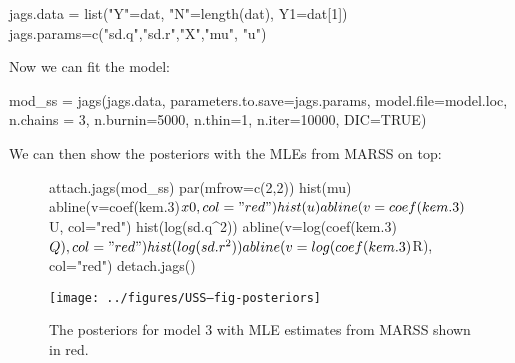 \begin{Schunk}
\begin{Sinput}
 jags.data = list("Y"=dat, "N"=length(dat), Y1=dat[1])
 jags.params=c("sd.q","sd.r","X","mu", "u")
\end{Sinput}
\end{Schunk}
Now we can fit the model:
\begin{Schunk}
\begin{Sinput}
 mod_ss = jags(jags.data, parameters.to.save=jags.params, 
      model.file=model.loc, n.chains = 3, 
      n.burnin=5000, n.thin=1, n.iter=10000, DIC=TRUE)
\end{Sinput}
\end{Schunk}

We can then show the posteriors with the MLEs from MARSS on top:
\begin{figure}[htp]
\begin{center}
\begin{Schunk}
\begin{Sinput}
 attach.jags(mod_ss)
 par(mfrow=c(2,2))
 hist(mu)
 abline(v=coef(kem.3)$x0, col="red")
 hist(u)
 abline(v=coef(kem.3)$U, col="red")
 hist(log(sd.q^2))
 abline(v=log(coef(kem.3)$Q), col="red")
 hist(log(sd.r^2))
 abline(v=log(coef(kem.3)$R), col="red")
 detach.jags()
\end{Sinput}
\end{Schunk}
\texttt{[image: ../figures/USS--fig-posteriors]}
\end{center}
\caption{The posteriors for model 3 with MLE estimates from MARSS shown in red.}
\label{fig:posteriors}
\end{figure}

